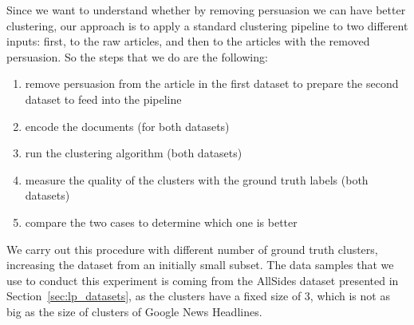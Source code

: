 Since we want to understand whether by removing persuasion we can have better clustering, our approach is to apply a standard clustering pipeline to two different inputs: first, to the raw articles, and then to the articles with the removed persuasion. So the steps that we do are the following: %
\begin{enumerate}
    \item remove persuasion from the article in the first dataset to prepare the second dataset to feed into the pipeline
    \item encode the documents (for both datasets)
    \item run the clustering algorithm (both datasets)
    \item measure the quality of the clusters with the ground truth labels (both datasets)
    \item compare the two cases to determine which one is better
\end{enumerate}

We carry out this procedure with different number of ground truth clusters, increasing the dataset from an initially small subset.%
The data samples that we use to conduct this experiment is coming from the AllSides dataset presented in Section~\ref{sec:lp_datasets}, as the clusters have a fixed size of 3, which is not as big as the size of clusters of Google News Headlines.



